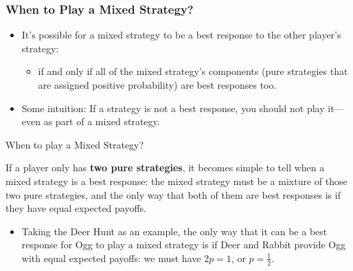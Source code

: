 \begin{frame}
\frametitle{When to Play a Mixed Strategy?}
\begin{itemize}

	\item It's possible for a mixed strategy to be a best response to the other player's strategy:

  \begin{itemize}
    \item if and only if all of the mixed strategy's \alert{components} (pure strategies that are assigned positive probability) are best responses too.
  \end{itemize}

	\item Some intuition: If a strategy is not a best response, you should not play it---even as part of a mixed strategy.

\end{itemize}
\end{frame}

\begin{frame}{When to play a Mixed Strategy?}

  If a player only has \textbf{two pure strategies}, it becomes simple to tell when a mixed strategy is a best response: the mixed strategy must be a mixture of those two pure strategies, and the only way that both of them are best responses is if they have equal expected payoffs.

\begin{itemize}
	\item Taking the Deer Hunt as an example, the only way that it can be a best response for Ogg to play a mixed strategy is if Deer and Rabbit provide Ogg with equal expected payoffs: we must have $2p = 1$, or $p = \frac{1}{2}$.
\end{itemize}
\end{frame}



